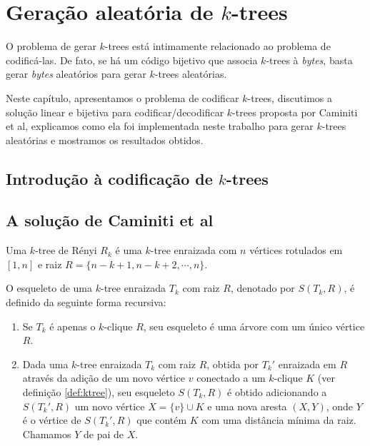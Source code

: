 \chapter{Geração aleatória de $k$-trees}
\label{cap:geracao}

O problema de gerar $k$-trees está intimamente relacionado ao problema de codificá-las. De fato, se há um código bijetivo que associa $k$-trees à \emph{bytes}, basta gerar \emph{bytes} aleatórios para gerar $k$-trees aleatórias.

Neste capítulo, apresentamos o problema de codificar $k$-trees, discutimos a solução linear e bijetiva para codificar/decodificar $k$-trees proposta por Caminiti et al\cite{caminiti}, explicamos como ela foi implementada neste trabalho para gerar $k$-trees aleatórias e mostramos os resultados obtidos.

\section{Introdução à codificação de $k$-trees}


\section{A solução de Caminiti et al}

\begin{definition}
  \cite{renyi} Uma $k$-tree de Rényi $R_k$ é uma $k$-tree enraizada com $n$ vértices rotulados em $[1, n]$ e raiz $R = \{n-k+1, n-k+2, \cdots, n\}$.
\end{definition}

\begin{definition}
  \label{def:skeleton}
  \cite{caminiti} O esqueleto de uma $k$-tree enraizada $T_k$ com raiz $R$, denotado por $S(T_k, R)$, é definido da seguinte forma recursiva:

  \begin{enumerate}
    \item Se $T_k$ é apenas o $k$-clique $R$, seu esqueleto é uma árvore com um único vértice $R$.
    \item Dada uma $k$-tree enraizada $T_k$ com raiz $R$, obtida por $T_k'$ enraizada em $R$ através da adição de um novo vértice $v$ conectado a um $k$-clique $K$ (ver definição \ref{def:ktree}), seu esqueleto $S(T_k, R)$ é obtido adicionando a $S(T_k', R)$ um novo vértice $X = \{v\} \cup K$ e uma nova aresta $(X, Y)$, onde $Y$ é o vértice de $S(T_k', R)$ que contém $K$ com uma distância mínima da raiz. Chamamos $Y$ de pai de $X$.
  \end{enumerate}
\end{definition}

